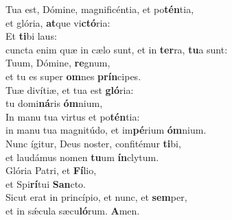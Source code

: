 \evenverse Tua est, Dómine, magnificéntia, et po\textbf{tén}tia,~\*\\
\evenverse et glória, \textbf{at}que vi\textbf{ctó}ria:\\
\oddverse Et \textbf{ti}bi laus:~\*\\
\oddverse cuncta enim quæ in cælo sunt, et in \textbf{ter}ra, \textbf{tu}a sunt:\\
\evenverse Tuum, Dómine, \textbf{re}gnum,~\*\\
\evenverse et tu es super \textbf{om}nes \textbf{prín}cipes.\\
\oddverse Tuæ divítiæ, et tua est \textbf{gló}ria:~\*\\
\oddverse tu domi\textbf{ná}ris \textbf{óm}nium,\\
\evenverse In manu tua virtus et po\textbf{tén}tia:~\*\\
\evenverse in manu tua magnitúdo, et im\textbf{pé}rium \textbf{óm}nium.\\
\oddverse Nunc ígitur, Deus noster, confitémur \textbf{ti}bi,~\*\\
\oddverse et laudámus nomen \textbf{tu}um \textbf{ín}clytum.\\
\evenverse Glória Patri, et \textbf{Fí}lio,~\*\\
\evenverse et Spi\textbf{rí}tui \textbf{San}cto.\\
\oddverse Sicut erat in princípio, et nunc, et \textbf{sem}per,~\*\\
\oddverse et in sǽcula sæcu\textbf{ló}rum. \textbf{A}men.\\
